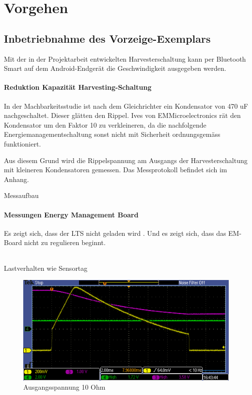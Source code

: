 \chapter{Vorgehen}


\section{Inbetriebnahme des Vorzeige-Exemplars}
Mit der in der Projektarbeit entwickelten Harvesterschaltung kann per Bluetooth Smart auf dem Android-Endgerät die Geschwindigkeit ausgegeben werden. 


\subsubsection{Reduktion Kapazität Harvesting-Schaltung}
In der Machbarkeitsstudie ist nach dem Gleichrichter ein Kondensator von 470 uF nachgeschaltet. Dieser glätten den Rippel. Ives von EMMicroelectronics rät den Kondensator um den Faktor 10 zu verkleineren, da die nachfolgende Energiemanagementschaltung sonst nicht mit Sicherheit ordnungsgemäss funktioniert. 

Aus diesem Grund wird die Rippelspannung am Ausgangs der Harvesterschaltung mit kleineren Kondensatoren gemessen. Das Messprotokoll befindet sich im Anhang.

Messaufbau




\pagebreak 
\subsubsection{Messungen Energy Management Board}

 
Es zeigt sich, dass der LTS nicht geladen wird . Und es zeigt sich, dass das EM-Board nicht zu regulieren beginnt.

\\

Lastverhalten wie Sensortag

\begin{figure}[h]
\includegraphics[bb=0 100 50 50]{EMBoardAusgang10Ohm.PNG}
\caption{Ausgangsspannung 10 Ohm}
\end{figure}

